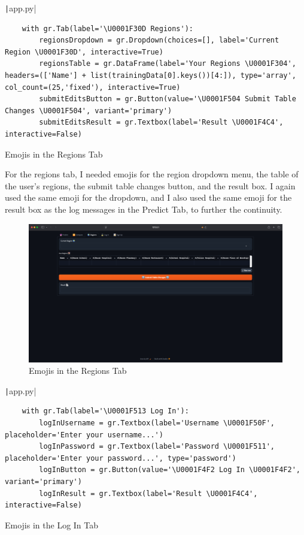\documentclass[12pt]{report}
\newcommand{\pil}[1]{\protect\texttt|#1|}
\begin{document}
\begin{listing}[H]
\pil{app.py}
\begin{verbatim}
    with gr.Tab(label='\U0001F30D Regions'):
        regionsDropdown = gr.Dropdown(choices=[], label='Current Region \U0001F30D', interactive=True)
        regionsTable = gr.DataFrame(label='Your Regions \U0001F304', headers=(['Name'] + list(trainingData[0].keys())[4:]), type='array', col_count=(25,'fixed'), interactive=True)
        submitEditsButton = gr.Button(value='\U0001F504 Submit Table Changes \U0001F504', variant='primary')
        submitEditsResult = gr.Textbox(label='Result \U0001F4C4', interactive=False)
\end{verbatim}
\caption{Emojis in the Regions Tab}\label{cs:emojis4}
\end{listing}

For the regions tab, I needed emojis for the region dropdown menu, the table of the user's regions, the submit table changes button, and the result box. I again used the same emoji for the dropdown, and I also used the same emoji for the result box as the log messages in the Predict Tab, to further the continuity.

\begin{figure}[H]
\centering
\includegraphics[width=14cm]{ss22.10.png}
\caption{Emojis in the Regions Tab}\label{fig:ss22.10}
\end{figure}

\begin{listing}[H]
\pil{app.py}
\begin{verbatim}
    with gr.Tab(label='\U0001F513 Log In'):
        logInUsername = gr.Textbox(label='Username \U0001F50F', placeholder='Enter your username...')
        logInPassword = gr.Textbox(label='Password \U0001F511', placeholder='Enter your password...', type='password')
        logInButton = gr.Button(value='\U0001F4F2 Log In \U0001F4F2', variant='primary')
        logInResult = gr.Textbox(label='Result \U0001F4C4', interactive=False)
\end{verbatim}
\caption{Emojis in the Log In Tab}\label{cs:emojis5}
\end{listing}
\end{document}
